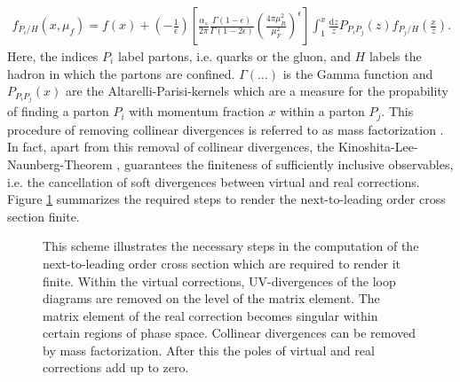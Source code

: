 \begin{align}
f_{P_i / H}(x,\mu_f) = f(x) + \left( -\frac{1}{\epsilon} \right)\left[ \frac{\alpha_s}{2\pi} \frac{\Gamma(1-\epsilon)}{\Gamma(1-2\epsilon)} \left( \frac{4\pi\mu_R^2}{\mu_F^2} \right)^\epsilon\right] \int_1^x\frac{\mathrm{d}z}{z} P_{P_i P_j}(z)f_{P_j / H}(\frac{x}{z}).\label{eq:renpdf}
\end{align}
Here, the indices $P_i$ label partons, i.e. quarks or the gluon, and $H$ labels the hadron in which the partons are confined. $\Gamma(\hdots)$ is the Gamma function and $P_{P_i P_j}(x)$ are the Altarelli-Parisi-kernels\cite{Altarelli:1977zs} which are a measure for the propability of finding a parton $P_i$ with momentum fraction $x$ within a parton $P_j$. This procedure of removing collinear divergences is referred to as mass factorization \cite{dissertori2003quantum}.\\
In fact, apart from this removal of collinear divergences, the Kinoshita-Lee-Naunberg-Theorem \cite{1962JMP.....3..650K},\cite{PhysRev.133.B1549} guarantees the finiteness of sufficiently inclusive observables, i.e. the cancellation of soft divergences between virtual and real corrections.\\
Figure \ref{fig:DivergenceSummary} summarizes the required steps to render the next-to-leading order cross section finite.
\begin{figure}[H]
\begin{center}
\caption{This scheme illustrates the necessary steps in the computation of the next-to-leading order cross section which are required to render it finite. Within the virtual corrections, UV-divergences of the loop diagrams are removed on the level of the matrix element. The matrix element of the real correction becomes singular within certain regions of phase space. Collinear divergences can be removed by mass factorization. After this the poles of virtual and real corrections add up to zero.}\label{fig:DivergenceSummary}
\end{center}
\end{figure}



